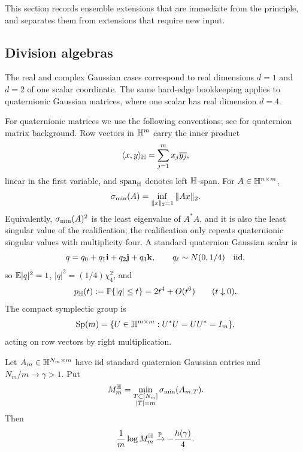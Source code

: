 This section records ensemble extensions that are immediate from the principle,
and separates them from extensions that require new input.

\subsection{Division algebras}

The real and complex Gaussian cases correspond to real dimensions \(d=1\) and
\(d=2\) of one scalar coordinate.  The same hard-edge bookkeeping applies to
quaternionic Gaussian matrices, where one scalar has real dimension \(d=4\).

For quaternionic matrices we use the following conventions; see
\cite{Zhang1997Quaternions} for quaternion matrix background.  Row vectors in
\(\mathbb{H}^m\) carry the inner product
\[
  \langle x,y\rangle_{\mathbb{H}}=\sum_{j=1}^m x_j\overline{y_j},
\]
linear in the first variable, and \(\operatorname{span}_{\mathbb{H}}\) denotes left
\(\mathbb{H}\)-span.  For \(A\in\mathbb{H}^{n\times m}\),
\[
  \sigma_{\min}(A)=\inf_{\|x\|_2=1}\|Ax\|_2 .
\]
Equivalently, \(\sigma_{\min}(A)^2\) is the least eigenvalue of \(A^*A\), and it is
also the least singular value of the realification; the realification only
repeats quaternionic singular values with multiplicity four.  A standard
quaternion Gaussian scalar is
\[
  q=q_0+q_1\mathbf i+q_2\mathbf j+q_3\mathbf k,
  \qquad q_\ell\sim N(0,1/4)\quad\hbox{iid},
\]
so \(\mathbb{E}|q|^2=1\), \(|q|^2=(1/4)\chi^2_4\), and
\[
  p_{\mathbb{H}}(t):=\mathbb{P}\{|q|\le t\}=2t^4+O(t^6)\qquad(t\downarrow0).
\]
The compact symplectic group is
\[
  \operatorname{Sp}(m)=\{U\in\mathbb{H}^{m\times m}:U^*U=UU^*=I_m\},
\]
acting on row vectors by right multiplication.

\begin{theorem}\label{thm:quaternion-gaussian-base}
Let \(A_m\in\mathbb{H}^{N_m\times m}\) have iid standard quaternion Gaussian entries
and \(N_m/m\to\gamma>1\).  Put
\[
  M_m^{\mathbb{H}}=\min_{\substack{T\subset[N_m]\\ |T|=m}}\sigma_{\min}(A_{m,T}).
\]
Then
\[
  \frac{1}{m}\log M_m^{\mathbb{H}}
  \xrightarrow{\mathbb{P}}-\frac{h(\gamma)}{4}.
\]
\end{theorem}

